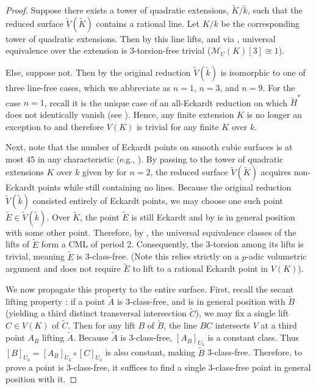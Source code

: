 \documentclass[11pt]{article}
\theoremstyle{definition}
\begin{document}
\begin{proof}
\label{proof:thm-a}
Suppose there exists a tower of quadratic extensions, $\tilde{K}/\tilde{k}$, such that the reduced surface $\tilde{V}(\tilde{K})$ contains a rational line. Let $K/k$ be the corresponding tower of quadratic extensions.
Then by 
this line lifts, and via , universal equivalence over the extension is 3-torsion-free trivial ($\mathcal{M}_U(K)[3] \cong 1$).

Else, suppose not. Then by \cite[\S 5]{swinnertondyer} the original reduction $\tilde{V}(\tilde{k})$ is isomorphic to one of three line-free cases, which we abbreviate as $n = 1$, $n = 3$, and $n = 9$. For the case $n = 1$, recall it is the unique case of an all-Eckardt reduction on which $\tilde{H}^*$ does not identically vanish (see \cite[\S 1]{swinnertondyer}). Hence, any finite extension $K$ is no longer an exception to  and therefore $V(K)$ is trivial for any finite $K$ over $k$. 

Next, note that the number of Eckardt points on smooth cubic surfaces is at most 45 in any characteristic (e.g., \cite[Lemma 20.2.7]{hirschfeld-lines}). By passing to the tower of quadratic extensions $K$ over $k$ given by  for $n=2$, the reduced surface $\tilde{V}(\tilde{K})$ acquires non-Eckardt points while still containing no lines. Because the original reduction $\tilde{V}(\tilde{k})$ consisted entirely of Eckardt points, we may choose one such point $\tilde{E} \in \tilde{V}(\tilde{k})$. Over $\tilde{K}$, the point $\tilde{E}$ is still Eckardt and by  is in general position with some other point. Therefore, by , the universal equivalence classes of the lifts of $\tilde{E}$ form a CML of period 2. Consequently, the 3-torsion among its lifts is trivial, meaning $\tilde{E}$ is 3-class-free. (Note this relies strictly on a $p$-adic volumetric argument and does not require $\tilde{E}$ to lift to a rational Eckardt point in $V(K)$).

We now propagate this property to the entire surface. First, recall the secant lifting property \cite[remark before Lemma 15]{swinnertondyer}: if a point $\tilde{A}$ is 3-class-free, and is in general position with $\tilde{B}$ (yielding a third distinct transversal intersection $\tilde{C}$), we may fix a single lift $C \in V(K)$ of $\tilde{C}$. Then for any lift $B$ of $\tilde{B}$, the line $BC$ intersects $V$ at a third point $A_B$ lifting $\tilde{A}$. Because $\tilde{A}$ is 3-class-free, $[A_B]_{U_3}$ is a constant class. Thus $[B]_{U_3} = [A_B]_{U_3} \circ [C]_{U_3}$ is also constant, making $\tilde{B}$ 3-class-free. Therefore, to prove a point is 3-class-free, it suffices to find a single 3-class-free point in general position with it.


\end{proof}
\end{document}
